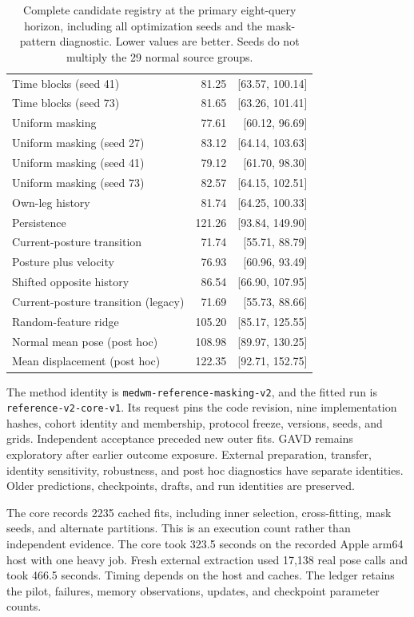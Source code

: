 \documentclass[letterpaper]{article}
\begin{document}
\begin{table}[t]
\begin{tabular}{lrr}
Time blocks (seed 41) & 81.25 & [63.57, 100.14] \\
Time blocks (seed 73) & 81.65 & [63.26, 101.41] \\
Uniform masking & 77.61 & [60.12, 96.69] \\
Uniform masking (seed 27) & 83.12 & [64.14, 103.63] \\
Uniform masking (seed 41) & 79.12 & [61.70, 98.30] \\
Uniform masking (seed 73) & 82.57 & [64.15, 102.51] \\
Own-leg history & 81.74 & [64.25, 100.33] \\
Persistence & 121.26 & [93.84, 149.90] \\
Current-posture transition & 71.74 & [55.71, 88.79] \\
Posture plus velocity & 76.93 & [60.96, 93.49] \\
Shifted opposite history & 86.54 & [66.90, 107.95] \\
Current-posture transition (legacy) & 71.69 & [55.73, 88.66] \\
Random-feature ridge & 105.20 & [85.17, 125.55] \\
Normal mean pose (post hoc) & 108.98 & [89.97, 130.25] \\
Mean displacement (post hoc) & 122.35 & [92.71, 152.75] \\
\bottomrule
\end{tabular}
\caption{Complete candidate registry at the primary eight-query horizon, including all optimization seeds and the mask-pattern diagnostic. Lower values are better. Seeds do not multiply the 29 normal source groups.}
\label{tab:complete_forecasts}
\end{table}

The method identity is \texttt{medwm-reference-masking-v2}, and the fitted run is \texttt{reference-v2-core-v1}. Its request pins the code revision, nine implementation hashes, cohort identity and membership, protocol freeze, versions, seeds, and grids. Independent acceptance preceded new outer fits. GAVD remains exploratory after earlier outcome exposure. External preparation, transfer, identity sensitivity, robustness, and post hoc diagnostics have separate identities. Older predictions, checkpoints, drafts, and run identities are preserved.

The core records 2235 cached fits, including inner selection, cross-fitting, mask seeds, and alternate partitions. This is an execution count rather than independent evidence. The core took 323.5 seconds on the recorded Apple arm64 host with one heavy job. Fresh external extraction used 17,138 real pose calls and took 466.5 seconds. Timing depends on the host and caches. The ledger retains the pilot, failures, memory observations, updates, and checkpoint parameter counts.
\end{document}
